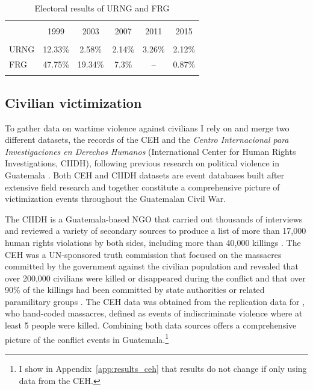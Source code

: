 \documentclass[12pt, notitlepage]{article}
\begin{document}
\vspace{15pt}
\begin{table}[!htbp] \centering
  \caption{Electoral results of URNG and FRG}\label{tab:elec_results}
  \small

  \begin{tabular}{lccccc}
  \\[-1.8ex]\hline
  \hline \\[-1.8ex]
    & 1999 & 2003 & 2007 & 2011 & 2015 \\
  \hline \\[-1.8ex]
  URNG & 12.33\% & 2.58\% & 2.14\% & 3.26\% & 2.12\% \\
  FRG & 47.75\% & 19.34\% & 7.3\% & -- & 0.87\% \\
  \hline
  \hline \\[-1.8ex]
  \end{tabular}

\end{table}

\subsection*{Civilian victimization}

To gather data on wartime violence against civilians I rely on and merge two different datasets, the records of the CEH and the \textit{Centro Internacional para Investigaciones en Derechos Humanos} (International Center for Human Rights Investigations, CIIDH), following previous research on political violence in Guatemala \citep{Chamarbagwala:2011aa, Sullivan:2012aa}.
Both CEH and CIIDH datasets are event databases built after extensive field research and together constitute a comprehensive picture of victimization events throughout the Guatemalan Civil War.

The CIIDH is a Guatemala-based NGO that carried out thousands of interviews and reviewed a variety of secondary sources to produce a list of more than 17,000 human rights violations by both sides, including more than 40,000 killings \citep{Ball:1999aa}.
The CEH was a UN-sponsored truth commission that focused on the massacres committed by the government against the civilian population and revealed that over 200,000 civilians were killed or disappeared during the conflict and that over 90\% of the killings had been committed by state authorities or related paramilitary groups \citep{CEH:1999aa}.
The CEH data was obtained from the replication data for \citet{Sullivan:2012aa}, who hand-coded massacres, defined as events of indiscriminate violence where at least 5 people were killed.
Combining both data sources offers a comprehensive picture of the conflict events in Guatemala.\footnote{I show in Appendix~\ref{app:results_ceh} that results do not change if only using data from the CEH.}
\end{document}
